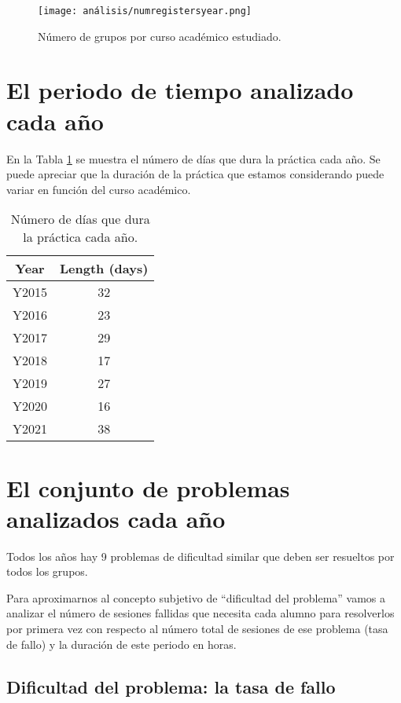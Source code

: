 \begin{figure}[H]
    \centering
    \texttt{[image: análisis/numregistersyear.png]}
    \caption{Número de grupos por curso académico estudiado.}
    \label{fig:groupsperyear}
\end{figure}

\section{El periodo de tiempo analizado cada año}

En la Tabla \ref{tab:days} se muestra el número de días que dura la práctica cada año. Se puede apreciar que la duración de la práctica que estamos considerando puede variar en función del curso académico.

\begin{table}[H]
\centering
\caption{Número de días que dura la práctica cada año.}
\label{tab:days}
\begin{tabular}{cc}
\hline
\textbf{Year}  & \textbf{Length (days)}  \\ \hline
Y2015 & 32 \\
Y2016 & 23 \\
Y2017 & 29 \\
Y2018 & 17 \\
Y2019 & 27 \\
Y2020 & 16 \\
Y2021 & 38 \\ \hline
\end{tabular}
\end{table}

\section{El conjunto de problemas analizados cada año}

Todos los años hay 9 problemas de dificultad similar que deben ser resueltos por todos los grupos.

Para aproximarnos al concepto subjetivo de ``dificultad del problema'' vamos a analizar el número de sesiones fallidas que necesita cada alumno para resolverlos por primera vez con respecto al número total de sesiones de ese problema (tasa de fallo) y la duración de este periodo en horas.

\subsection{Dificultad del problema: la tasa de fallo}

